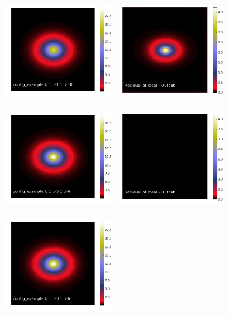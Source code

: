 \documentclass[12pt,preprint]{aastex6}
\begin{document}
\begin{figure}[!htbp]
\includegraphics[height=47mm,width=49mm]{f3f.png}
\includegraphics[height=47mm,width=49mm]{f3g.png}
\includegraphics[height=47mm,width=49mm]{f3h.png}
\includegraphics[height=47mm,width=49mm]{f3i.png}
\includegraphics[height=47mm,width=49mm]{f3j.png}

\end{figure}
\end{document}
